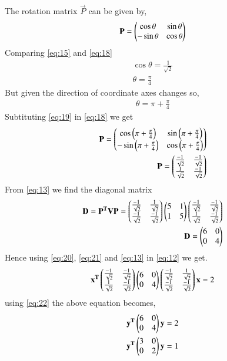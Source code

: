 \documentclass[journal,12pt,twocolumn]{IEEEtran}
\begin{document}
The rotation matrix $\vec{P}$ can be given by,
\begin{align}
\mathbf{P}=\begin{pmatrix}\cos{\theta}&\sin{\theta}\\-\sin{\theta}&\cos{\theta}\end{pmatrix}\label{eq:18}
\end{align}
Comparing \eqref{eq:15} and \eqref{eq:18}
\begin{align}
\cos{\theta} = \frac{1}{\sqrt{2}}\\
\theta = \frac{\pi}{4} 
\end{align}
But given the direction of coordinate axes changes so,
\begin{align}
\theta = \pi +\frac{\pi}{4}\label{eq:19}
\end{align}
Subtituting \eqref{eq:19} in \eqref{eq:18} we get 
\begin{align}
\mathbf{P}=\begin{pmatrix}\cos{\ensuremath{\left(\pi +\frac{\pi}{4}\right)}} & \sin{\ensuremath{\left(\pi +\frac{\pi}{4}\right)}}\\-\sin{\ensuremath{\left(\pi +\frac{\pi}{4}\right)}}&\cos{\ensuremath{\left(\pi +\frac{\pi}{4}\right)}}\end{pmatrix}\\
\mathbf{P}=\begin{pmatrix}\frac{-1}{\sqrt{2}}&\frac{-1}{\sqrt{2}}\\\frac{1}{\sqrt{2}}&\frac{-1}{\sqrt{2}}\end{pmatrix}\label{eq:20}
\end{align}
From \eqref{eq:13} we find the diagonal matrix
\begin{align}
\mathbf{D}=\mathbf{P^T}\mathbf{V}\mathbf{P} = \begin{pmatrix}\frac{-1}{\sqrt{2}}&\frac{1}{\sqrt{2}}\\\frac{-1}{\sqrt{2}}&\frac{-1}{\sqrt{2}}\end{pmatrix}\begin{pmatrix}5&1\\1&5\end{pmatrix}\begin{pmatrix}\frac{-1}{\sqrt{2}}&\frac{-1}{\sqrt{2}}\\\frac{1}{\sqrt{2}}&\frac{-1}{\sqrt{2}}\end{pmatrix}\\
\mathbf{D}=\begin{pmatrix}6&0\\0&4\end{pmatrix}\label{eq:21}
\end{align}
Hence using \eqref{eq:20}, \eqref{eq:21} and \eqref{eq:13} in \eqref{eq:12} we get.
\begin{align}
\mathbf{x^T}\begin{pmatrix}\frac{-1}{\sqrt{2}}&\frac{-1}{\sqrt{2}}\\\frac{1}{\sqrt{2}}&\frac{-1}{\sqrt{2}}\end{pmatrix}\begin{pmatrix}6&0\\0&4\end{pmatrix}\begin{pmatrix}\frac{-1}{\sqrt{2}}&\frac{1}{\sqrt{2}}\\\frac{-1}{\sqrt{2}}&\frac{-1}{\sqrt{2}}\end{pmatrix}\mathbf{x}=2
\end{align}
using \eqref{eq:22} the above equation becomes,
\begin{align}
\mathbf{y^T}\begin{pmatrix}6&0\\0&4\end{pmatrix}\mathbf{y}=2\\
\mathbf{y^T}\begin{pmatrix}3&0\\0&2\end{pmatrix}\mathbf{y}=1\label{eq:23}
\end{align} 
\end{document}

